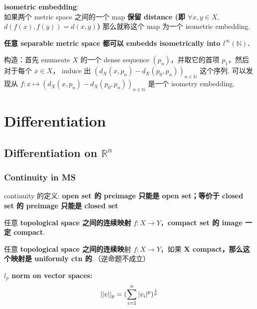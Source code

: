 \documentclass[lang=cn,11pt]{elegantbook}
\begin{document}
\begin{definition}
    \textbf{isometric embedding}: \\
    如果两个 metric space 之间的一个 map\textbf{ 保留 distance (即 $\forall x,y \in X, $ $d(f(x), f(y)) = d(x,y)$)} 那么就称这个 map 为一个 isometric embedding.
\end{definition}

\begin{theorem}
    \textbf{任意 separable metric space 都可以 embedds isometrically into $l^{\infty}(\mathbb{N})$.}
\end{theorem}

\proof 构造：首先 enumeate  $X$ 的一个 dense sequence $(p_n)$，并取它的首项 $p_1$，然后对于每个 $x \in X$， induce 出 $(d_X(x, p_n) - d_X(p_0, p_n))_{n \in \mathbb{N}}$ 这个序列. 可以发现从 $f: x \mapsto (d_X(x, p_n) - d_X(p_0, p_n))_{n \in \mathbb{N}}$ 是一个 isometry embedding. 

\chapter{Differentiation}
\section{Differentiation on $\mathbb{R}^n$}
\subsection{Continuity in MS}
\begin{remark}
    continuity 的定义: \textbf{open set 的 preimage 只能是 open set；等价于 closed set 的 preimage 只能是 closed set}
\end{remark}


\begin{theorem}
任意\textbf{ topological space 之间的连续映射} $ f:X \rightarrow Y$，\textbf{compact set 的 image 一定 compact}.
\end{theorem}

\begin{theorem}
任意 \textbf{topological space 之间的连续映}射 $f:X \rightarrow Y$，如果 \textbf{X compact，那么这个映射是 uniformly ctn 的}.（逆命题不成立）
\end{theorem}

\begin{definition}
    \textbf{$l_p$ norm on vector spaces:}\\
$$||v||_p = (\sum_{i = 1}^n |v_i|^p)^{1\over p}$$
\end{definition}
\end{document}
